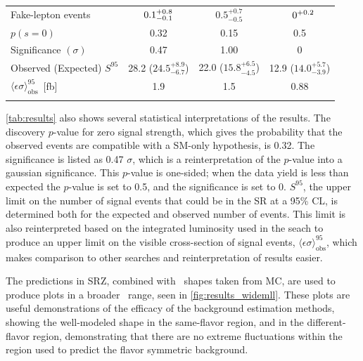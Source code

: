 \begin{table}
\begin{center}
\begin{tabular*}{\textwidth}{@{\extracolsep{\fill}}lccc}
 Fake-lepton events                                                         & $\makebox[3ex]{\hfill 0.1}_{-0.1}^{+0.8}$   & $0.5_{-0.5}^{+0.7}$ &   $\makebox[3ex]{\hfill 0}^{+0.2}$    \\
 \noalign{\smallskip}\hline\noalign{\smallskip}
$p(s=0)$                                                                    & 0.32      & 0.15        & 0.5        \\
Significance $(\sigma)$                                                               & 0.47                     & 1.00                   & 0           \\
Observed (Expected) $S^{95}$                                                & 28.2 ($24.5_{-6.7}^{+8.9}$) & 22.0 ($15.8_{-4.5}^{+6.5}$) & 12.9 ($14.0_{-3.9}^{+5.7}$) \\
$\langle\epsilon\sigma\rangle^{95}_\text{obs}$~[fb]                         & 1.9             & 1.5                    & 0.88   \\
 \noalign{\smallskip}\hline\noalign{\smallskip}
\end{tabular*}
\end{center}
\label{tab:results}
\end{table}

\autoref{tab:results} also shows several statistical interpretations of the results. The discovery $p$-value for zero signal strength, which gives the probability that the observed events are compatible with a \ac{SM}-only hypothesis, is 0.32. The significance is listed as 0.47 $\sigma$, which is a reinterpretation of the $p$-value into a gaussian significance. This $p$-value is one-sided; when the data yield is less than expected the $p$-value is set to 0.5, and the significance is set to 0. $S^{95}$, the upper limit on the number of signal events that could be in the \ac{SR} at a 95\% \ac{CL}, is determined both for the expected and observed number of events. This limit is also reinterpreted based on the integrated luminosity used in the seach to produce an upper limit on the visible cross-section of signal events, $\langle\epsilon\sigma\rangle^{95}_\text{obs}$, which makes comparison to other searches and reinterpretation of results easier.

The predictions in SRZ, combined with \mll~shapes taken from \ac{MC}, are used to produce plots in a broader \mll~range, seen in \autoref{fig:results_widemll}. These plots are useful demonstrations of the efficacy of the background estimation methods, showing the well-modeled \dyjets shape in the same-flavor region, and in the different-flavor region, demonstrating that there are no extreme fluctuations within the region used to predict the flavor symmetric background.

